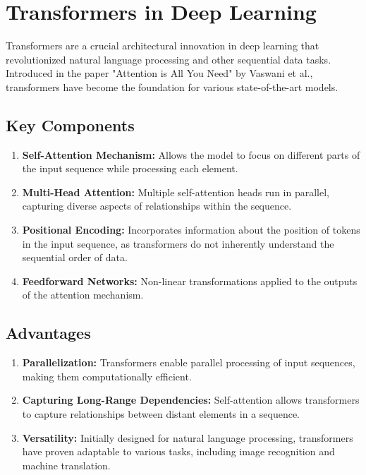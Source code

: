 \section{Transformers in Deep Learning}
Transformers are a crucial architectural innovation in deep learning that revolutionized  natural language processing and other sequential data tasks. Introduced in the paper \cite{Attention} "Attention is All You Need" by Vaswani et al., transformers have become the foundation for various state-of-the-art models.



\subsection*{Key Components}
\begin{enumerate}
    \item \textbf{Self-Attention Mechanism:} Allows the model to focus on different parts of the input sequence while processing each element.
    \item \textbf{Multi-Head Attention:} Multiple self-attention heads run in parallel, capturing diverse aspects of relationships within the sequence.
    \item \textbf{Positional Encoding:} Incorporates information about the position of tokens in the input sequence, as transformers do not inherently understand the sequential order of data.
    \item \textbf{Feedforward Networks:} Non-linear transformations applied to the outputs of the attention mechanism.
\end{enumerate}

\subsection*{Advantages}
\begin{enumerate}
    \item \textbf{Parallelization:} Transformers enable parallel processing of input sequences, making them computationally efficient.
    \item \textbf{Capturing Long-Range Dependencies:} Self-attention allows transformers to capture relationships between distant elements in a sequence.
    \item \textbf{Versatility:} Initially designed for natural language processing, transformers have proven adaptable to various tasks, including image recognition and machine translation.
\end{enumerate}


